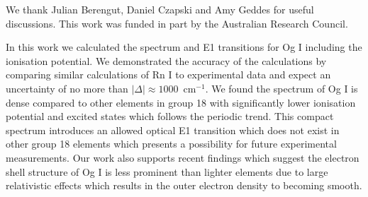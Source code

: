 \documentclass[10pt,a4paper, twoside, openright]{report}
\begin{document}
We thank Julian Berengut, Daniel Czapski and Amy Geddes for useful discussions.
This work was funded in part by the Australian Research Council.

In this work we calculated the spectrum and E1 transitions for Og I including the ionisation potential. We demonstrated the accuracy of the calculations by comparing similar calculations of Rn I to experimental data and expect an uncertainty of no more than $|\Delta| \approx 1000$~cm$^{-1}$. We found the spectrum of Og I is dense compared to other elements in  group 18 with significantly lower ionisation potential and excited states which follows the periodic trend. This compact spectrum introduces an allowed optical E1 transition which does not exist in other group 18 elements which presents a possibility for future experimental measurements. Our work also supports recent findings\cite{Jerabek2018} which suggest the electron shell structure of Og I is less prominent than lighter elements due to large relativistic effects which results in the outer electron density to becoming smooth. \\


\appendix
\end{document}
